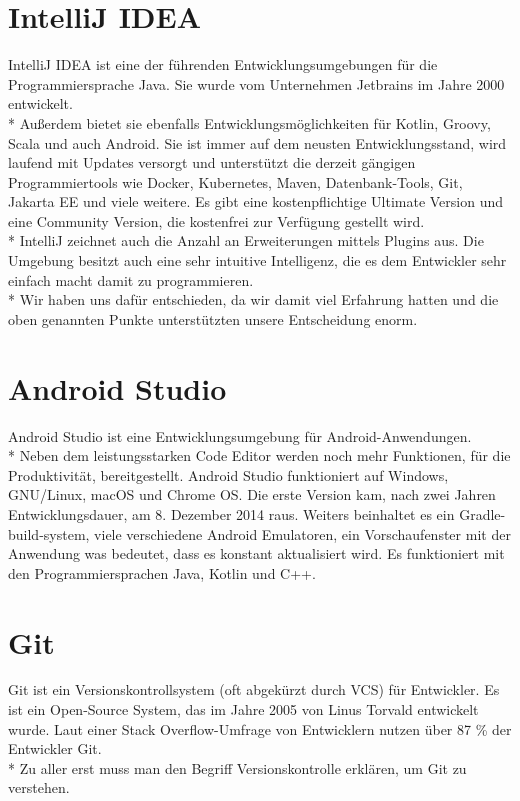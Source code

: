 \section{IntelliJ IDEA}
\author{Benjamin Besic}

IntelliJ IDEA ist eine der führenden Entwicklungsumgebungen für die Programmiersprache Java. Sie wurde vom Unternehmen Jetbrains im Jahre 2000 entwickelt.
\\* Außerdem bietet sie ebenfalls Entwicklungsmöglichkeiten für Kotlin, Groovy, Scala und auch Android.
 Sie ist immer auf dem neusten Entwicklungsstand, wird laufend mit Updates versorgt und unterstützt die derzeit gängigen Programmiertools
wie Docker, Kubernetes, Maven, Datenbank-Tools, Git, Jakarta EE und viele weitere.
Es gibt eine kostenpflichtige Ultimate Version und eine Community Version, die kostenfrei zur Verfügung gestellt wird.
\\* IntelliJ zeichnet auch die Anzahl an Erweiterungen mittels Plugins aus. Die Umgebung besitzt auch eine
sehr intuitive Intelligenz, die es dem Entwickler sehr einfach macht damit zu programmieren.
\cite{IntJ} \\*
Wir haben uns dafür entschieden, da wir damit viel Erfahrung hatten und die oben genannten Punkte
unterstützten unsere Entscheidung enorm.

\section{Android Studio}
\author{Bozidar Spasenovic}
Android Studio ist eine Entwicklungsumgebung für Android-Anwendungen.
\\* 
Neben dem leistungsstarken Code Editor werden noch mehr Funktionen, für die Produktivität, bereitgestellt. 
Android Studio funktioniert auf Windows, GNU/Linux, macOS und Chrome OS. Die erste Version kam, nach zwei Jahren Entwicklungsdauer, am 8. Dezember 2014 raus.
Weiters beinhaltet es ein Gradle-build-system, viele verschiedene Android Emulatoren, ein Vorschaufenster mit der Anwendung was bedeutet, dass es konstant aktualisiert wird. 
Es funktioniert mit den Programmiersprachen Java, Kotlin und C++. 

\section{Git}
\author{Benjamin Besic}
Git ist ein Versionskontrollsystem (oft abgekürzt durch VCS) für Entwickler. Es ist ein Open-Source System, das im Jahre 2005
von Linus Torvald entwickelt wurde. Laut einer Stack Overflow-Umfrage von Entwicklern nutzen über 87 \% der Entwickler Git.
\cite{GitKinsta}
\\* Zu aller erst muss man den Begriff Versionskontrolle erklären, um Git zu verstehen.
